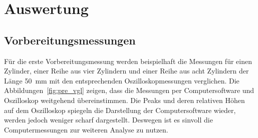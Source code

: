 \newpage
\section{Auswertung}
    \subsection{Vorbereitungsmessungen}
        Für die erste Vorbereitungsmessung werden beispielhaft die Messungen für einen Zylinder, einer Reihe aus vier Zylindern und einer Reihe aus acht Zylindern der Länge \SI{50}{\milli\metre} mit den 
        entsprechenden Oszilloskopmessungen verglichen. Die Abbildungen~\ref{fig:pre_vgl} zeigen, dass die Messungen per Computersoftware und Oszilloskop weitgehend übereinstimmen. Die Peaks und deren 
        relativen Höhen auf dem Oszilloskop spiegeln die Darstellung der Computersoftware wieder, werden jedoch weniger scharf dargestellt. Deswegen ist es sinvoll die Computermessungen zur weiteren Analyse
        zu nutzen. 
